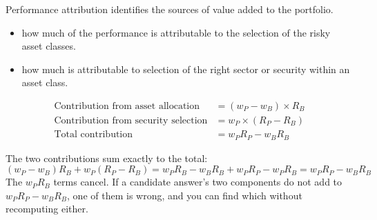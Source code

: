
Performance attribution identifies the sources of value added to the portfolio.

\begin{itemize}
\item {} how much of the performance is attributable to the
selection of the risky asset classes.
\item {} how much is attributable to selection of the
right sector or security within an asset class.
\end{itemize}

\begin{imfmlbox}
\begin{align*}
\text{Contribution from asset allocation} &= (w_P - w_B) \times R_B \\
\text{Contribution from security selection} &= w_P \times (R_P - R_B) \\[3pt]
\text{Total contribution} &= w_P R_P - w_B R_B
\end{align*}
\end{imfmlbox}

\begin{imkeybox}[title={The identity, and why it is worth checking}]
The two contributions sum exactly to the total:
\[ (w_P - w_B)R_B + w_P(R_P - R_B)
   = w_P R_B - w_B R_B + w_P R_P - w_P R_B
   = w_P R_P - w_B R_B \]
The $w_P R_B$ terms cancel. If a candidate answer's two components do not add to
$w_P R_P - w_B R_B$, one of them is wrong, and you can find which without
recomputing either.
\end{imkeybox}

